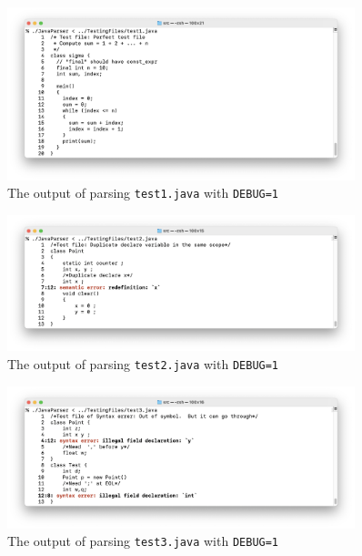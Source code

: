 \documentclass[12pt]{article}
\begin{document}
\begin{figure}
\begin{center}
\includegraphics[width=0.9\textwidth]{Screenshots/test1}
\end{center}
\caption{The output of parsing \texttt{test1.java} with \texttt{DEBUG=1}}
\label{test1}
\end{figure}
\begin{figure}
\begin{center}
\includegraphics[width=0.9\textwidth]{Screenshots/test2}
\end{center}
\caption{The output of parsing \texttt{test2.java} with \texttt{DEBUG=1}}
\label{test1}
\end{figure}
\begin{figure}
\begin{center}
\includegraphics[width=0.9\textwidth]{Screenshots/test3}
\end{center}
\caption{The output of parsing \texttt{test3.java} with \texttt{DEBUG=1}}
\label{test1}
\end{figure}
\end{document}
